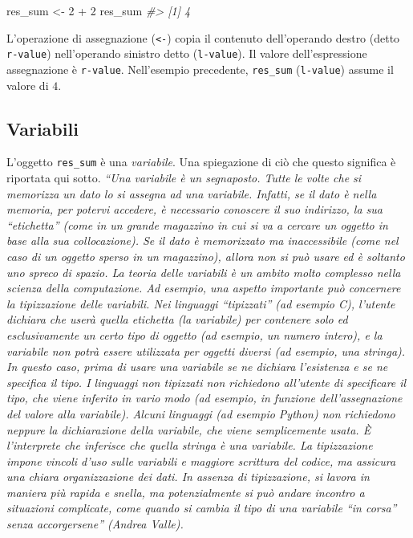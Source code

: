 \documentclass[
  11pt,
]{krantz}
\makeatletter
\newenvironment{Shaded}{\begin{snugshade}}{\end{snugshade}}
\newcommand{\CommentTok}[1]{\textcolor[rgb]{0.37,0.37,0.37}{\textit{#1}}}
\newcommand{\DecValTok}[1]{\textcolor[rgb]{0.06,0.06,0.06}{#1}}
\newcommand{\NormalTok}[1]{#1}
\newcommand{\OtherTok}[1]{\textcolor[rgb]{0.37,0.37,0.37}{#1}}
\newcommand{\SpecialCharTok}[1]{\textcolor[rgb]{0,0,0}{#1}}
\newenvironment{kframe}{%
\medskip{}
\setlength{\fboxsep}{.8em}
 \def\at@end@of@kframe{}%
 \ifinner\ifhmode%
  \def\at@end@of@kframe{\end{minipage}}%
  \begin{minipage}{\columnwidth}%
 \fi\fi%
 \def\FrameCommand##1{\hskip\@totalleftmargin \hskip-\fboxsep
 \colorbox{shadecolor}{##1}\hskip-\fboxsep
     \hskip-\linewidth \hskip-\@totalleftmargin \hskip\columnwidth}%
 \MakeFramed {\advance\hsize-\width
   \@totalleftmargin\z@ \linewidth\hsize
   \@setminipage}}%
 {\par\unskip\endMakeFramed%
 \at@end@of@kframe}
\renewenvironment{Shaded}{\begin{kframe}}{\end{kframe}}
\theoremstyle{definition}
\theoremstyle{definition}
\theoremstyle{definition}
\theoremstyle{definition}
\theoremstyle{remark}
\makeatother
\begin{document}
\begin{Shaded}
\begin{Highlighting}[]
\NormalTok{res\_sum }\OtherTok{\textless{}{-}} \DecValTok{2} \SpecialCharTok{+} \DecValTok{2}
\NormalTok{res\_sum}
\CommentTok{\#\textgreater{} [1] 4}
\end{Highlighting}
\end{Shaded}

L'operazione di assegnazione (\texttt{\textless{}-}) copia il contenuto dell'operando destro (detto \texttt{r-value}) nell'operando sinistro detto (\texttt{l-value}). Il valore dell'espressione assegnazione è \texttt{r-value}. Nell'esempio precedente, \texttt{res\_sum} (\texttt{l-value}) assume il valore di \(4\).

\hypertarget{variabili}{%
\subsection{Variabili}\label{variabili}}

L'oggetto \texttt{res\_sum} è una \emph{variabile}. Una spiegazione di ciò che questo significa è riportata qui sotto. \emph{``Una variabile è un segnaposto. Tutte le volte che si memorizza un dato lo si assegna ad una variabile. Infatti, se il dato è nella memoria, per potervi accedere, è necessario conoscere il suo indirizzo, la sua ``etichetta'' (come in un grande magazzino in cui si va a cercare un oggetto in base alla sua collocazione). Se il dato è memorizzato ma inaccessibile (come nel caso di un oggetto sperso in un magazzino), allora non si può usare ed è soltanto uno spreco di spazio. La teoria delle variabili è un ambito molto complesso nella scienza della computazione. Ad esempio, una aspetto importante può concernere la tipizzazione delle variabili. Nei linguaggi ``tipizzati'' (ad esempio C), l'utente dichiara che userà quella etichetta (la variabile) per contenere solo ed esclusivamente un certo tipo di oggetto (ad esempio, un numero intero), e la variabile non potrà essere utilizzata per oggetti diversi (ad esempio, una stringa). In questo caso, prima di usare una variabile se ne dichiara l'esistenza e se ne specifica il tipo. I linguaggi non tipizzati non richiedono all'utente di specificare il tipo, che viene inferito in vario modo (ad esempio, in funzione dell'assegnazione del valore alla variabile). Alcuni linguaggi (ad esempio Python) non richiedono neppure la dichiarazione della variabile, che viene semplicemente usata. È l'interprete che inferisce che quella stringa è una variabile. La tipizzazione impone vincoli d'uso sulle variabili e maggiore scrittura del codice, ma assicura una chiara organizzazione dei dati. In assenza di tipizzazione, si lavora in maniera più rapida e snella, ma potenzialmente si può andare incontro a situazioni complicate, come quando si cambia il tipo di una variabile ``in corsa'' senza accorgersene'' (Andrea Valle).}
\end{document}
